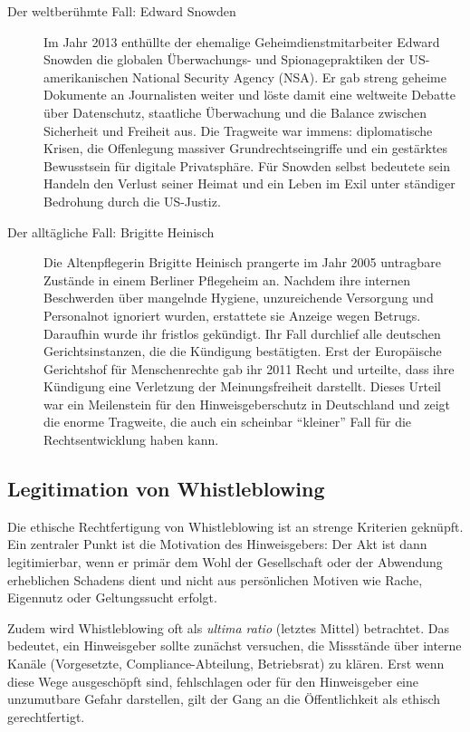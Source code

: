\documentclass[
    12pt,               %
    a4paper,            %
    ngerman             %
]{scrartcl}
\begin{document}
\begin{description}
    \item[Der weltberühmte Fall: Edward Snowden] Im Jahr 2013 enthüllte der ehemalige Geheimdienstmitarbeiter Edward Snowden die globalen Überwachungs- und Spionagepraktiken der US-amerikanischen National Security Agency (NSA). Er gab streng geheime Dokumente an Journalisten weiter und löste damit eine weltweite Debatte über Datenschutz, staatliche Überwachung und die Balance zwischen Sicherheit und Freiheit aus. Die Tragweite war immens: diplomatische Krisen, die Offenlegung massiver Grundrechtseingriffe und ein gestärktes Bewusstsein für digitale Privatsphäre. Für Snowden selbst bedeutete sein Handeln den Verlust seiner Heimat und ein Leben im Exil unter ständiger Bedrohung durch die US-Justiz.
    
    \item[Der alltägliche Fall: Brigitte Heinisch] Die Altenpflegerin Brigitte Heinisch prangerte im Jahr 2005 untragbare Zustände in einem Berliner Pflegeheim an. Nachdem ihre internen Beschwerden über mangelnde Hygiene, unzureichende Versorgung und Personalnot ignoriert wurden, erstattete sie Anzeige wegen Betrugs. Daraufhin wurde ihr fristlos gekündigt. Ihr Fall durchlief alle deutschen Gerichtsinstanzen, die die Kündigung bestätigten. Erst der Europäische Gerichtshof für Menschenrechte gab ihr 2011 Recht und urteilte, dass ihre Kündigung eine Verletzung der Meinungsfreiheit darstellt. Dieses Urteil war ein Meilenstein für den Hinweisgeberschutz in Deutschland und zeigt die enorme Tragweite, die auch ein scheinbar \enquote{kleiner} Fall für die Rechtsentwicklung haben kann.
\end{description}

\subsection{Legitimation von Whistleblowing}
Die ethische Rechtfertigung von Whistleblowing ist an strenge Kriterien geknüpft. Ein zentraler Punkt ist die Motivation des Hinweisgebers: Der Akt ist dann legitimierbar, wenn er primär dem Wohl der Gesellschaft oder der Abwendung erheblichen Schadens dient und nicht aus persönlichen Motiven wie Rache, Eigennutz oder Geltungssucht erfolgt.

Zudem wird Whistleblowing oft als \textit{ultima ratio} (letztes Mittel) betrachtet. Das bedeutet, ein Hinweisgeber sollte zunächst versuchen, die Missstände über interne Kanäle (Vorgesetzte, Compliance-Abteilung, Betriebsrat) zu klären. Erst wenn diese Wege ausgeschöpft sind, fehlschlagen oder für den Hinweisgeber eine unzumutbare Gefahr darstellen, gilt der Gang an die Öffentlichkeit als ethisch gerechtfertigt.
\end{document}

